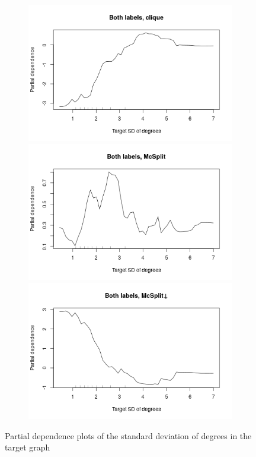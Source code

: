 \documentclass{l4proj}
\theoremstyle{definition}
\theoremstyle{remark}
\begin{document}
\begin{figure}
\begin{subfigure}[t]{0.49\textwidth}
  \end{subfigure}
  \begin{subfigure}[t]{0.49\textwidth}
    \centering
    \includegraphics[width=\textwidth]{images/both_labels_clique_stddeg.png}
    \includegraphics[width=\textwidth]{images/both_labels_mcsplit_stddeg.png}
    \includegraphics[width=\textwidth]{images/both_labels_mcsplitdown_stddeg.png}
  \end{subfigure}
  \caption{Partial dependence plots of the standard deviation of degrees in the
    target graph}
  \label{fig:stddeg_partials}
\end{figure}
\end{document}
